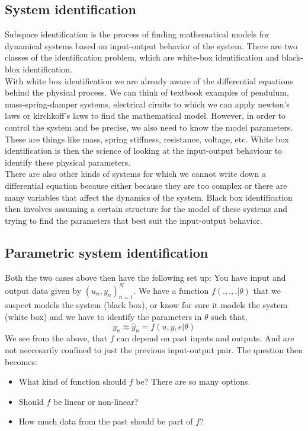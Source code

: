 \subsection{System identification} 
Subspace identification is the process of finding mathematical models for dynamical systems based on input-output behavior of the system. There are two classes of the identification problem, which are white-box identification and black-blox identification.\\
\newline
With white box identification we are already aware of the differential equations behind the physical process. We can think of textbook examples of pendulum, mass-spring-damper systems, electrical ciruits to which we can apply newton's laws or kirchkoff's laws to find the mathematical model. However, in order to control the system and be precise, we also need to know the model parameters. These are things like mass, spring stiffness, resistance, voltage, etc. White box identification is then the science of looking at the input-output behaviour to identify these physical parameters.\\
\newline
There are also other kinds of systems for which we cannot write down a differential equation because either because they are too complex or there are many variables that affect the dynamics of the system. Black box identification then involves assuming a certain structure for the model of these systems and trying to find the parameters that best suit the input-output behavior. 
\subsection{Parametric system identification} 
Both the two cases above then have the following set up: You have input and output data given by $(u_{n}, y_{n})_{n = 1}^{N}$. We have a function $f(.,.,.|\theta)$ that we suspect models the system (black box), or know for sure it models the system (white box) and we have to identify the parameters in $\theta$ such that,
\begin{equation}
	y_{n} \approx \hat{y}_{n} = f(u, y, e|\theta)
\end{equation}
We see from the above, that $f$ can depend on past inputs and outputs. And are not neccesarily confined to just the previous input-output pair. 
The question then becomes: 
\begin{itemize}
	\item What kind of function should $f$ be? There are so many options. 
	\item Should $f$ be linear or non-linear? 
	\item How much data from the past should be part of $f$? 
\end{itemize}
